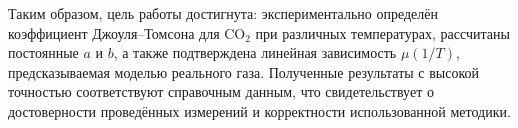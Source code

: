 \documentclass[a4paper, 12pt]{article}
\begin{document}
Таким образом, цель работы достигнута: экспериментально определён коэффициент Джоуля–Томсона для \(\text{CO}_2\) при различных температурах, рассчитаны постоянные \(a\) и \(b\), а также подтверждена линейная зависимость \(\mu(1/T)\), предсказываемая моделью реального газа. Полученные результаты с высокой точностью соответствуют справочным данным, что свидетельствует о достоверности проведённых измерений и корректности использованной методики.
\end{document}
